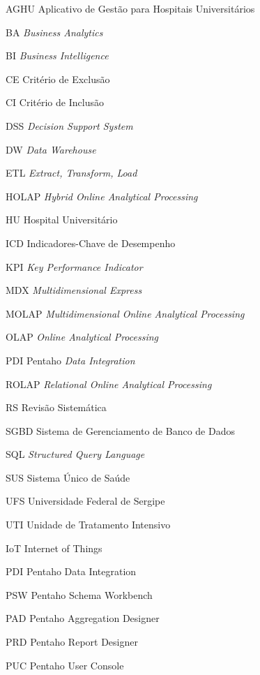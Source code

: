 
\begin{siglas}
\item[AGHU]{Aplicativo de Gestão para Hospitais Universitários}
\item[BA]{\textit{Business Analytics}}
\item[BI]{\textit{Business Intelligence}}
\item[CE]{Critério de Exclusão}
\item[CI]{Critério de Inclusão}
\item[DSS]{\textit{Decision Support System}}
\item[DW]{\textit{Data Warehouse}}
\item[ETL]{\textit{Extract, Transform, Load}}
\item[HOLAP]{\textit{Hybrid Online Analytical Processing}}
\item[HU]{Hospital Universitário}
\item[ICD]{Indicadores-Chave de Desempenho}
\item[KPI]{\textit{Key Performance Indicator}}
\item[MDX]{\textit{Multidimensional Express}}
\item[MOLAP]{\textit{Multidimensional Online Analytical Processing}}
\item[OLAP]{\textit{Online Analytical Processing}}
\item[PDI]{Pentaho \textit{Data Integration}}
\item[ROLAP]{\textit{Relational Online Analytical Processing}}
\item[RS]{Revisão Sistemática}
\item[SGBD]{Sistema de Gerenciamento de Banco de Dados}
\item[SQL]{\textit{Structured Query Language}}
\item[SUS]{Sistema Único de Saúde}
\item[UFS]{Universidade Federal de Sergipe}
\item[UTI]{Unidade de Tratamento Intensivo}
\item[IoT]{Internet of Things}
\item[PDI]{Pentaho Data Integration}
\item[PSW]{Pentaho Schema Workbench}
\item[PAD]{Pentaho Aggregation Designer}
\item[PRD]{Pentaho Report Designer}
\item[PUC]{Pentaho User Console}
\end{siglas}
